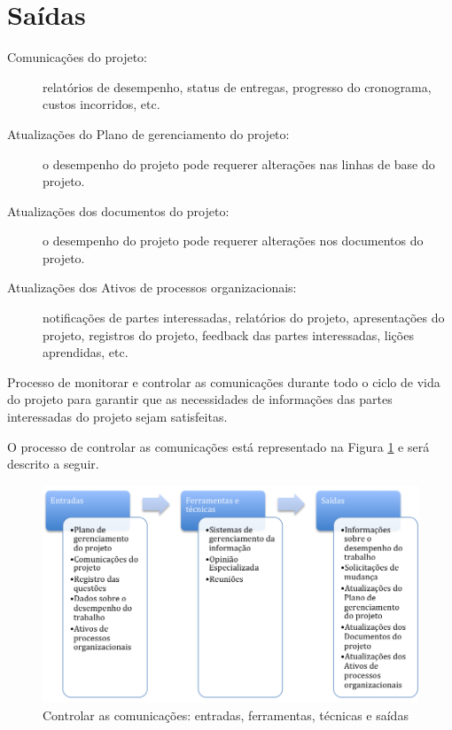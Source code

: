 \section{Saídas}

\begin{description}
	
	\item[Comunicações do projeto:] relatórios de desempenho, status de entregas, progresso do cronograma, custos incorridos, etc.
	
	\item[Atualizações do Plano de gerenciamento do projeto:] o desempenho do projeto pode requerer alterações nas linhas de base do projeto.
	
	\item[Atualizações dos documentos do projeto:] o desempenho do projeto pode requerer alterações nos documentos do projeto.
	
	\item[Atualizações dos Ativos de processos organizacionais:] notificações de partes interessadas, relatórios do projeto, apresentações do projeto, registros do projeto, feedback das partes interessadas, lições aprendidas, etc.


\end{description}


Processo de monitorar e controlar as comunicações durante todo o ciclo de vida do projeto para garantir que as necessidades de informações das partes interessadas do projeto sejam satisfeitas.

O processo de controlar as comunicações está representado na Figura \ref{fig:comunic:controlar:efts} e será descrito a seguir.

\begin{figure}[!h]
	\centering
	\includegraphics[scale=0.5]{Figuras/comunicacoes_efts_controlar.png}
	\caption{Controlar as comunicações: entradas, ferramentas, técnicas e saídas}
	\label{fig:comunic:controlar:efts}
\end{figure}

